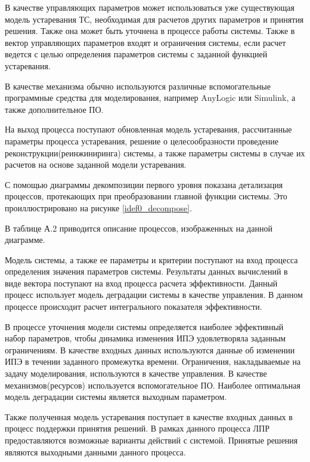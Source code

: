 В качестве управляющих параметров может использоваться уже существующая модель устаревания ТС, необходимая для расчетов других параметров и принятия решения. 
Также она может быть уточнена в процессе работы системы. 
Также в вектор управляющих параметров входят и ограничения системы, если расчет ведется с целью определения параметров системы с заданной функцией устаревания.

В качестве механизма обычно используются различные вспомогательные программные средства для моделирования, например AnyLogic или Simulink, а также дополнительное ПО.

На выход процесса поступают обновленная модель устаревания, рассчитанные параметры процесса устаревания, решение о целесообразности проведение реконструкции(реинжиниринга) системы, а также параметры системы в случае их расчетов на основе заданной модели устаревания.

С помощью диаграммы декомпозиции первого уровня показана детализация процессов, протекающих при преобразовании главной функции системы. Это проиллюстрировано на рисунке \ref{idef0_decompose}.

В таблице А.2 приводится описание процессов, изображенных на данной диаграмме.


Модель системы, а также ее параметры и критерии поступают на вход процесса определения значения параметров системы. 
Результаты данных вычислений в виде вектора поступают на вход процесса расчета эффективности. 
Данный процесс использует модель деградации системы в качестве управления. 
В данном процессе происходит расчет интегрального показателя эффективности. 

В процессе уточнения модели системы определяется наиболее эффективный набор параметров, чтобы динамика изменения ИПЭ удовлетворяла заданным ограничениям. 
В качестве входных данных используются данные об изменении ИПЭ в течении заданного промежутка времени. 
Ограничения, накладываемые на задачу моделирования, используются в качестве управления. 
В качестве механизмов(ресурсов) используется вспомогательное ПО. 
Наиболее оптимальная модель деградации системы является выходным параметром.

Также полученная модель устаревания поступает в качестве входных данных в процесс поддержки принятия решений. 
В рамках данного процесса ЛПР предоставляются возможные варианты действий с системой.
Принятые решения являются выходными данными данного процесса.

